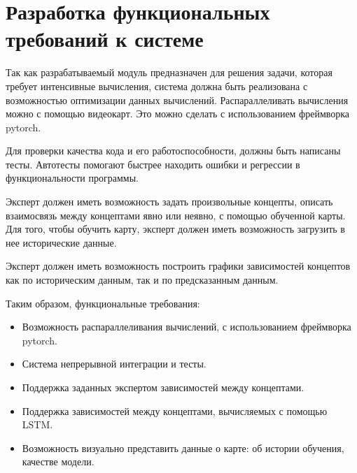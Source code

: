 





\section{Разработка функциональных требований к системе}

Так как разрабатываемый модуль предназначен для решения задачи, которая
требует интенсивные вычисления, система должна быть реализована
с возможностью оптимизации данных вычислений. Распараллеливать вычисления
можно с помощью видеокарт. Это можно сделать с использованием фреймворка pytorch.

Для проверки качества кода и его работоспособности, должны быть написаны тесты.
Автотесты помогают быстрее находить ошибки и регрессии в функциональности программы.

Эксперт должен иметь возможность задать произвольные концепты, описать
взаимосвязь между концептами явно или неявно, с помощью обученной карты.
Для того, чтобы обучить карту, эксперт должен иметь возможность загрузить
в нее исторические данные.

Эксперт должен иметь возможность построить графики зависимостей концептов
как по историческим данным, так и по предсказанным данным.

Таким образом, функциональные требования:
\begin{itemize}
	\item Возможность распараллеливания вычислений, с использованием фреймворка pytorch.
	\item Система непрерывной интеграции и тесты.
	\item Поддержка заданных экспертом зависимостей между концептами.
	\item Поддержка зависимостей между концептами, вычисляемых с помощью LSTM.
	\item Возможность визуально представить данные о карте: об истории обучения, качестве модели.
\end{itemize}

